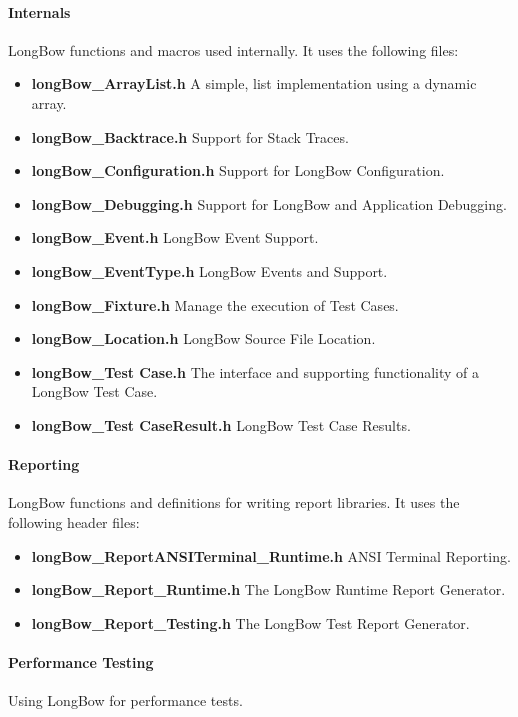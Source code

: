 \documentclass[12pt]{article} %
\begin{document}
\paragraph {Internals}
LongBow functions and macros used internally.
It uses the following files:

\begin{itemize}
 \item {\bf longBow\_ArrayList.h} A simple, list implementation using a dynamic array.  
 \item {\bf longBow\_Backtrace.h} Support for Stack Traces. 
 \item {\bf longBow\_Configuration.h} Support for LongBow Configuration. 
 \item {\bf longBow\_Debugging.h} Support for LongBow and Application Debugging. 
 \item {\bf longBow\_Event.h} LongBow Event Support. 
 \item {\bf longBow\_EventType.h} LongBow Events and Support. 
 \item {\bf longBow\_Fixture.h} Manage the execution of Test Cases. 
 \item {\bf longBow\_Location.h} LongBow Source File Location. 
 \item {\bf longBow\_Test Case.h} The interface and supporting functionality of a LongBow Test Case. 
 \item {\bf longBow\_Test CaseResult.h} LongBow Test Case Results. 
\end{itemize}
 
 
 \paragraph {Reporting}
LongBow functions and definitions for writing report libraries.  
It uses the following header files:

\begin{itemize}
 \item {\bf longBow\_ReportANSITerminal\_Runtime.h} ANSI Terminal Reporting.  
\item {\bf longBow\_Report\_Runtime.h} The LongBow Runtime Report Generator.  
\item {\bf longBow\_Report\_Testing.h} The LongBow Test Report Generator. 
\end{itemize}

 	
 \paragraph {Performance Testing}
Using LongBow for performance tests.
\end{document}
